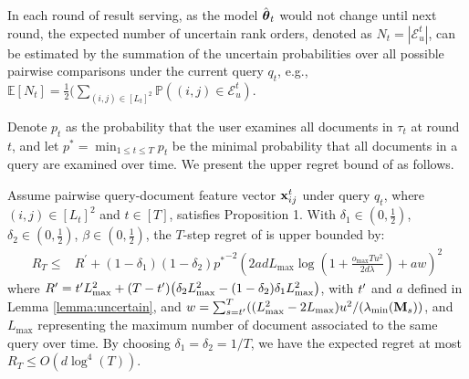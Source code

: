 In each round of result serving, as the model $\hat{\boldsymbol{\theta}}_t$ would not change until next round, the expected number of uncertain rank orders, denoted as $N_t=|\mathcal{E}_{u}^t|$, can be estimated by the summation of the uncertain probabilities over all possible pairwise comparisons under the current query $q_t$, e.g., $\mathbb{E}[N_t] = \frac{1}{2} (\sum_{(i, j) \in [L_t]^2}  \mathbb{P}((i, j) \in \mathcal{E}_u^t)$.

Denote $p_{t}$ as the probability that the user examines all documents in $\tau_t$ at round $t$, and let $p^* = \min_{1\leq t \leq T} p_{t}$ be the minimal probability that all documents in a query are examined over time. We present the upper regret bound of \model{} as follows.
\begin{theorem}
\label{theorem}
Assume pairwise query-document feature vector ${\mathbf{x}_{ij}^t}$ under query $q_t$, where $(i, j) \in [L_t]^2$ and $t \in [T]$, satisfies Proposition 1. With  $\delta_1 \in (0, \frac{1}{2})$, $\delta_2 \in (0, \frac{1}{2})$, $\beta \in (0, \frac{1}{2})$, the $T$-step regret of \model{} is upper bounded by:
\begin{align*}
    R_T 
     \leq& R^{\prime} + (1 - \delta_1)(1 - \delta_2) {p^*}^{-2}\left( 2adL_{\max}\log(1 + \frac{o_{\max}Tu^2}{2d\lambda}) + aw\right)^2
\end{align*}
where $R^{\prime} = t^\prime L_{\max}^2 + (T - t')\big(\delta_2L_{\max}^2 - (1- \delta_2)\delta_1 L_{\max}^2\big)$, with $t^\prime$ and $a$ defined in Lemma \ref{lemma:uncertain}, and $w = \sum\nolimits_{s=t^\prime}^T ({(L_{\max}^2 - 2L_{\max})u^2 }/({\lambda_{\min}(\mathbf{M}_s)})$, and $L_{\max}$ representing the maximum number of document associated to the same query over time.
By choosing $\delta_1 = \delta_2 = 1/T$, we have the expected regret at most $R_T \leq O(d\log^4(T))$.
\end{theorem}

